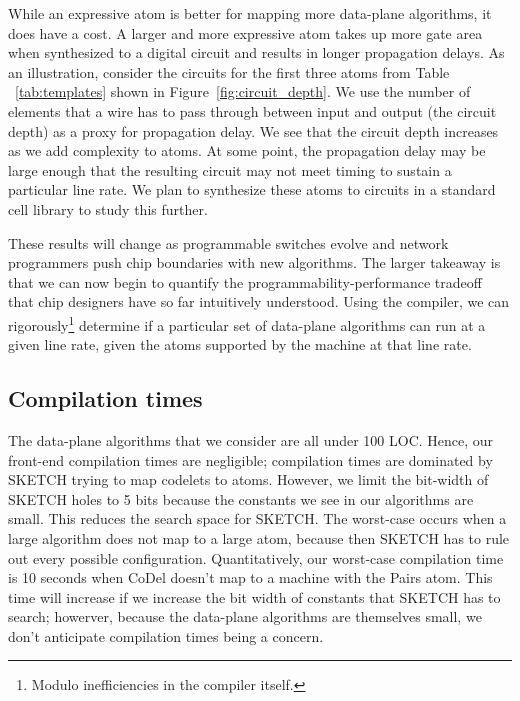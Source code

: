 While an expressive atom is better for mapping more data-plane algorithms, it
does have a cost. A larger and more expressive atom takes up more gate area
when synthesized to a digital circuit and results in longer propagation delays.
As an illustration, consider the circuits for the first three atoms from Table
~\ref{tab:templates} shown in Figure~\ref{fig:circuit_depth}. We use the number
of elements that a wire has to pass through between input and output (the
circuit depth) as a proxy for propagation delay. We see that the circuit depth
increases as we add complexity to atoms. At some point, the propagation delay
may be large enough that the resulting circuit may not meet timing to sustain a
particular line rate. We plan to synthesize these atoms to circuits in a
standard cell library to study this further.

These results will change as programmable switches evolve and network
programmers push chip boundaries with new algorithms.  The larger takeaway is
that we can now begin to quantify the programmability-performance tradeoff that
chip designers have so far intuitively understood. Using the \pktlanguage
compiler, we can rigorously\footnote{Modulo inefficiencies in the compiler
itself.} determine if a particular set of data-plane algorithms can run at a
given line rate, given the atoms supported by the \absmachine machine at that
line rate.

\subsection{Compilation times}
The data-plane algorithms that we consider are all under 100 LOC. Hence, our
front-end compilation times are negligible; compilation times are dominated by
SKETCH trying to map codelets to atoms. However, we limit the bit-width of
SKETCH holes to 5 bits because the constants we see in our algorithms are
small.  This reduces the search space for SKETCH.  The worst-case occurs when a
large algorithm does not map to a large atom, because then SKETCH has to rule
out every possible configuration. Quantitatively, our worst-case compilation
time is 10 seconds when CoDel doesn't map to a \absmachine machine with the
Pairs atom.  This time will increase if we increase the bit width of constants
that SKETCH has to search; howerver, because the data-plane algorithms are
themselves small, we don't anticipate compilation times being a concern.
